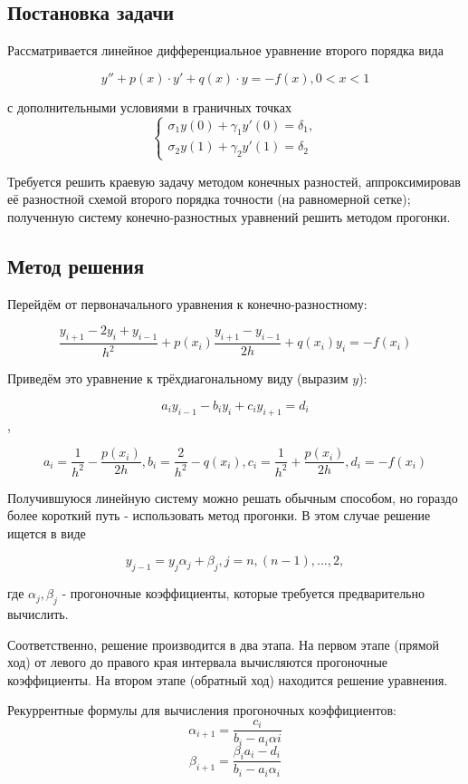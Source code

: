 \documentclass[a4paper,11pt]{report}
\begin{document}
\subsection*{Постановка задачи}

Рассматривается линейное дифференциальное уравнение второго порядка вида

$$
y'' + p(x) \cdot y' + q(x) \cdot y = - f(x), 0 < x < 1
$$

с дополнительными условиями в граничных точках 
$$
\begin{cases}
 \sigma_1 y(0) + \gamma_1y'(0) = \delta_1,\\
 \sigma_2 y(1) + \gamma_2y'(1) = \delta_2
\end{cases}
$$

Требуется решить краевую задачу методом конечных разностей, аппроксимировав её разностной схемой второго порядка точности (на равномерной
сетке); полученную систему конечно-разностных уравнений решить методом прогонки.

\subsection*{Метод решения}

Перейдём от первоначального уравнения к конечно-разностному:

$$
\frac{y_{i+1} - 2y_i + y_{i-1}}{h^2} + p(x_i) \frac{y_{i+1} - y_{i - 1}}{2h} + q(x_i)y_i = -f(x_i)
$$

Приведём это уравнение к трёхдиагональному виду (выразим $y$):

$$
a_i y_{i-1} - b_i y_i + c_i y_{i+1} = d_i
$$,

$$
a_i = \frac{1}{h^2} - \frac{p(x_i)}{2h}, b_i = \frac{2}{h^2} - q(x_i), c_i = \frac{1}{h^2} + \frac{p(x_i)}{2h}, d_i = -f(x_i)
$$

Получившуюся линейную систему можно решать обычным способом, но гораздо более короткий путь - использовать метод прогонки.
В этом случае решение ищется в виде

$$
y_{j-1} = y_j \alpha_j + \beta_j, j = n, (n-1), ..., 2,
$$

где $\alpha_j, \beta_j$ - прогоночные коэффициенты, которые требуется предварительно вычислить.

Соответственно, решение производится в два этапа. На первом этапе (прямой ход) от левого до правого края интервала вычисляются 
прогоночные коэффициенты. На втором этапе (обратный ход) находится решение уравнения.

Рекуррентные формулы для вычисления прогоночных коэффициентов:
$$
\alpha_{i+1} = \frac{c_i}{b_i - a_i \alpha{i}}
$$
$$
\beta_{i+1} = \frac{\beta_i a_i - d_i}{b_i - a_i \alpha_i}
$$
\end{document}
